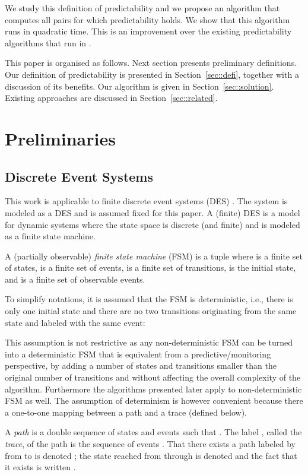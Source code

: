 \documentclass{article}
\begin{document}
We study this definition of predictability and 
we propose an algorithm that computes all pairs  
for which predictability holds.  
We show that this algorithm runs in quadratic time.  
This is an improvement over the existing predictability algorithms 
that run in .  

This paper is organised as follows.  
Next section presents preliminary definitions.  
Our definition of predictability is presented in Section~\ref{sec::defi}, 
together with a discussion of its benefits.  
Our algorithm is given in Section~\ref{sec::solution}.  
Existing approaches are discussed in Section~\ref{sec::related}.  

\section{Preliminaries}
\label{sec::prelim}
\subsection{Discrete Event Systems}

This work is applicable to finite discrete event systems (DES) 
\cite{cassandras-lafortune::99}.  
The system is modeled as a DES and is assumed fixed for this paper.  
A (finite) DES is a model for dynamic systems 
where the state space is discrete (and finite) 
and is modeled as a finite state machine.  


A (partially observable) \emph{finite state machine} (FSM) 
is a tuple  
where  is a finite set of states, 
 is a finite set of events, 
 is a finite set of transitions, 
 is the initial state, 
and 
 is a finite set of observable events.  

To simplify notations, it is assumed that the FSM is deterministic, 
i.e., there is only one initial state 
and there are no two transitions originating from the same state 
and labeled with the same event: 

This assumption is not restrictive 
as any non-deterministic FSM can be turned into a deterministic FSM 
that is equivalent from a predictive/monitoring perspective, 
by adding a number of states and transitions 
smaller than the original number of transitions 
and without affecting the overall complexity of the algorithm.  
Furthermore the algorithms presented later apply 
to non-deterministic FSM as well.  
The assumption of determinism is however convenient 
because there a one-to-one mapping between a path and a trace 
(defined below).  

A \emph{path}  is a double sequence 
of states and events  
such that .  
The label , called the \emph{trace}, of the path 
is the sequence of events .  
That there exists a path labeled by  from  to  
is denoted ; 
the state  reached from  through  is denoted  
and the fact that it exists is written .  
\end{document}
